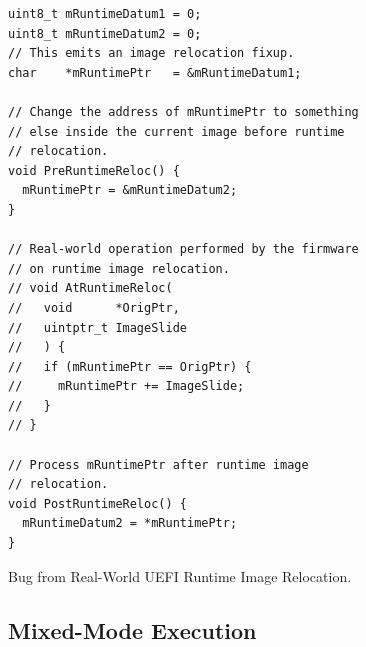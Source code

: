 \begin{lstfloat}[htbp]
  \centering
  \begin{lstlisting}[style=c]
uint8_t mRuntimeDatum1 = 0;
uint8_t mRuntimeDatum2 = 0;
// This emits an image relocation fixup.
char    *mRuntimePtr   = &mRuntimeDatum1;

// Change the address of mRuntimePtr to something
// else inside the current image before runtime
// relocation.
void PreRuntimeReloc() {
  mRuntimePtr = &mRuntimeDatum2;
}

// Real-world operation performed by the firmware
// on runtime image relocation.
// void AtRuntimeReloc(
//   void      *OrigPtr,
//   uintptr_t ImageSlide
//   ) {
//   if (mRuntimePtr == OrigPtr) {
//     mRuntimePtr += ImageSlide;
//   }
// }

// Process mRuntimePtr after runtime image
// relocation.
void PostRuntimeReloc() {
  mRuntimeDatum2 = *mRuntimePtr;
}
  \end{lstlisting}
  \caption{Bug from Real-World UEFI Runtime Image Relocation.}
  \label{fig:real_uefi_rt_reloc}
  \caption*{Erroneous program assuming real-world  \gls{runtime-image-relocation}. This bug mirrors the fault from . Real-world  implementations only relocate values that remain unchanged~\cite{edk2}, which mitigates the previous fault. Before entering the runtime phase, we change \lstinline|mRuntimePtr| to point to \lstinline[style=c]|mRuntimeDatum2|. As its address is different from that of \lstinline[style=c]|mRuntimeDatum1|, the \gls{image-relocation-fixup} is not applied, even though the address is within the \gls{image} \gls{address-space}. After the \gls{runtime-image-relocation} has succeeded, we run some code that should effectively assign \lstinline|mRuntimeDatum2| to itself. However, due to the incorrect address of \lstinline|mRuntimePtr|, we are reading arbitrary memory. One could argue that according to the  specification, \lstinline|ConvertPointer()| should have been called on \lstinline|mRuntimePtr|, which resolves the bug~\cite{uefi-spec}. However, the vague wording about reapplying of \glspl{image-relocation-fixup} and the correct behaviour for unmodified pointers make the situation ambiguous.}
\end{lstfloat}

\subsection{Mixed-Mode Execution}
\label{sec:mixed-mode}

